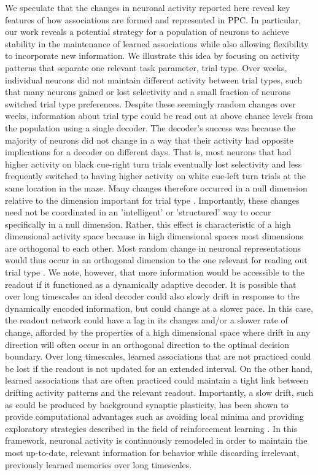 We speculate that the changes in neuronal activity reported here reveal key features of how associations are formed and represented in PPC. In particular, our work reveals a potential strategy for a population of neurons to achieve stability in the maintenance of learned associations while also allowing flexibility to incorporate new information. We illustrate this idea by focusing on activity patterns that separate one relevant task parameter, trial type. Over weeks, individual neurons did not maintain different activity between trial types, such that many neurons gained or lost selectivity and a small fraction of neurons switched trial type preferences. Despite these seemingly random changes over weeks, information about trial type could be read out at above chance levels from the population using a single decoder. The decoder's success was because the majority of neurons did not change in a way that their activity had opposite implications for a decoder on different days. That is, most neurons that had higher activity on black cue-right turn trials eventually lost selectivity and less frequently switched to having higher activity on white cue-left turn trials at the same location in the maze. Many changes therefore occurred in a null dimension relative to the dimension important for trial type \citep{Ajemian2013, Rokni2007a}. Importantly, these changes need not be coordinated in an 'intelligent' or 'structured' way to occur specifically in a null dimension. Rather, this effect is characteristic of a high dimensional activity space because in high dimensional spaces most dimensions are orthogonal to each other. Most random change in neuronal representations would thus occur in an orthogonal dimension to the one relevant for reading out trial type \citep{Buonomano2009}. We note, however, that more information would be accessible to the readout if it functioned as a dynamically adaptive decoder. It is possible that over long timescales an ideal decoder could also slowly drift in response to the dynamically encoded information, but could change at a slower pace. In this case, the readout network could have a lag in its changes and/or a slower rate of change, afforded by the properties of a high dimensional space where drift in any direction will often occur in an orthogonal direction to the optimal decision boundary. Over long timescales, learned associations that are not practiced could be lost if the readout is not updated for an extended interval. On the other hand, learned associations that are often practiced could maintain a tight link between drifting activity patterns and the relevant readout. Importantly, a slow drift, such as could be produced by background synaptic plasticity, has been shown to provide computational advantages such as avoiding local minima and providing exploratory strategies described in the field of reinforcement learning \citep{Kappel2015, Yu2016}. In this framework, neuronal activity is continuously remodeled in order to maintain the most up-to-date, relevant information for behavior while discarding irrelevant, previously learned memories over long timescales. 

